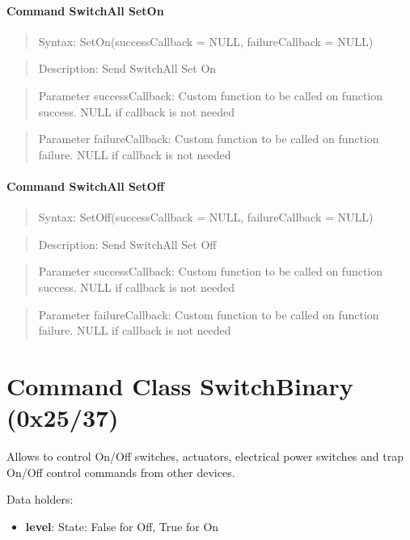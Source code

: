 \paragraph{Command SwitchAll SetOn}
\begin{quote}Syntax: SetOn(successCallback = NULL, failureCallback = NULL)\end{quote}
\begin{quote}Description: Send SwitchAll Set On\end{quote}
\begin{quote}Parameter successCallback: Custom function to be called on function success. NULL if callback is not needed\end{quote}
\begin{quote}Parameter failureCallback: Custom function to be called on function failure. NULL if callback is not needed\end{quote}


\paragraph{Command SwitchAll SetOff}
\begin{quote}Syntax: SetOff(successCallback = NULL, failureCallback = NULL)\end{quote}
\begin{quote}Description: Send SwitchAll Set Off\end{quote}
\begin{quote}Parameter successCallback: Custom function to be called on function success. NULL if callback is not needed\end{quote}
\begin{quote}Parameter failureCallback: Custom function to be called on function failure. NULL if callback is not needed\end{quote}



\section{Command Class SwitchBinary (0x25/37)}

Allows to control On/Off switches, actuators, electrical power switches and trap On/Off control commands from other devices.
\newline

\noindent
Data holders:

\begin{itemize}
\item \textbf{level}: State: False for Off, True for On
\end{itemize}

